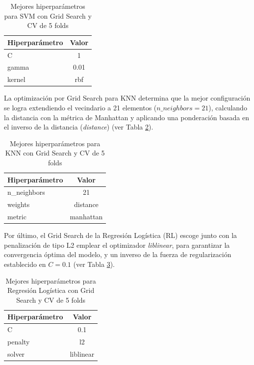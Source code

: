 \begin{table}
\centering
\begin{tabular}{lc}
\toprule
\textbf{Hiperparámetro} & \textbf{Valor}\\
\midrule
C & 1 \\
gamma & 0.01 \\
kernel & rbf \\
\bottomrule
\end{tabular}
\caption{Mejores hiperparámetros para SVM con Grid Search y CV de 5 folds}
\label{tab:grid_search_svm}
\end{table}

La optimización por Grid Search para KNN determina que la mejor configuración se logra extendiendo el vecindario a 21 elementos ($n\_neighbors=21$), calculando la distancia con la métrica de Manhattan y aplicando una ponderación basada en el inverso de la distancia (\textit{distance}) (ver Tabla \ref{tab:grid_search_knn}).

\begin{table}[h!]
\centering
\begin{tabular}{lc}
\toprule
\textbf{Hiperparámetro} & \textbf{Valor}\\
\midrule
n\_neighbors & 21 \\
weights & distance \\
metric & manhattan \\
\bottomrule
\end{tabular}
\caption{Mejores hiperparámetros para KNN con Grid Search y CV de 5 folds}
\label{tab:grid_search_knn}
\end{table}

Por último, el Grid Search de la Regresión Logística (RL) escoge junto con la penalización de tipo L2 emplear el optimizador \textit{liblinear}, para garantizar la convergencia óptima del modelo, y un inverso de la fuerza de regularización establecido en $C = 0.1$ (ver Tabla \ref{tab:grid_search_rl}).

\begin{table}[h!]
\centering
\begin{tabular}{lc}
\toprule
\textbf{Hiperparámetro} & \textbf{Valor}\\
\midrule
C & 0.1 \\
penalty & l2 \\
solver & liblinear \\
\bottomrule
\end{tabular}
\caption{Mejores hiperparámetros para Regresión Logística con Grid Search y CV de 5 folds}
\label{tab:grid_search_rl}
\end{table}

